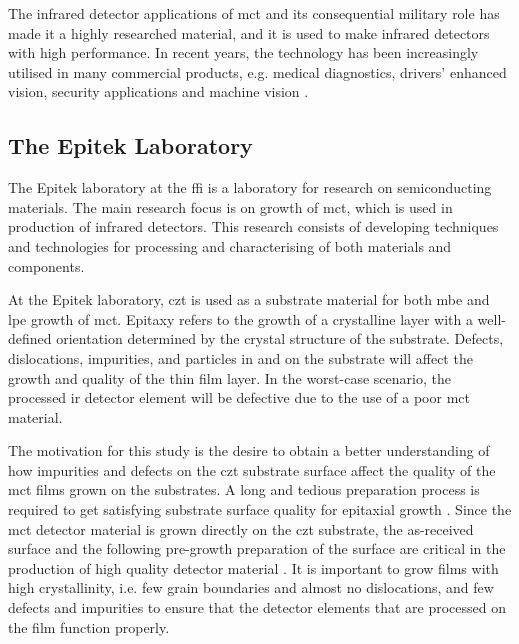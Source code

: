 The infrared detector applications of \ac{mct} and its consequential military role has made it a highly researched material, and it is used to make infrared detectors with high performance. In recent years, the technology has been increasingly utilised in many commercial products, e.g. medical diagnostics, drivers' enhanced vision, security applications and machine vision \citep{dhar2013advances}.

\subsection{The Epitek Laboratory}

The Epitek laboratory at the \ac{ffi} is a laboratory for research on semiconducting materials. The main research focus is on growth of \ac{mct}, which is used in production of infrared detectors. This research consists of developing techniques and technologies for processing and characterising of both materials and components.

At the Epitek laboratory, \ac{czt} is used as a substrate material for both \ac{mbe} and \ac{lpe} growth of \ac{mct}. Epitaxy refers to the growth of a crystalline layer with a well-defined orientation determined by the crystal structure of the substrate. Defects, dislocations, impurities, and particles in and on the substrate will affect the growth and quality of the thin film layer. In the worst-case scenario, the processed \ac{ir} detector element will be defective due to the use of a poor \ac{mct} material. %

The motivation for this study is the desire to obtain a better understanding of how impurities and defects on the \ac{czt} substrate surface affect the quality of the \ac{mct} films grown on the substrates. A long and tedious preparation process is required to get satisfying substrate surface quality for epitaxial growth \citep{triboulet2009cdteI}. Since the \ac{mct} detector material is grown directly on the \ac{czt} substrate, the as-received surface and the following pre-growth preparation of the surface are critical in the production of high quality detector material \citep{benson2015as-received}. It is important to grow films with high crystallinity, i.e. few grain boundaries and almost no dislocations, and few defects and impurities to ensure that the detector elements that are processed on the film function properly.

